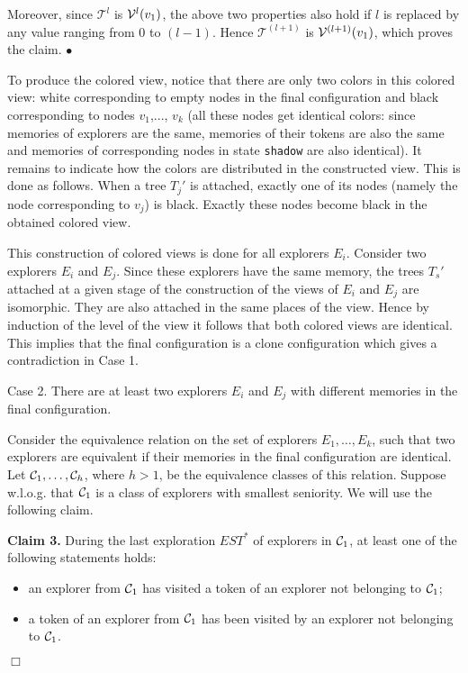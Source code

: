 \documentclass[11pt]{article}
\newcommand{\finclaim}{\hfill $\bullet$}
\newcommand{\qed}{\hfill $\Box$ \bigbreak}
\newenvironment{proof}{\noindent {\bf Proof.}}{\qed}
\newcommand{\cC}{{\cal C}}
\newcommand{\cV}{{\cal V}}
\begin{document}
\begin{proof}
{Moreover, since $\mathcal{T}^l$ is $\cV^l(v_1)$, the above two properties also hold if $l$ is replaced by any value ranging from $0$ to $(l-1)$. Hence $\mathcal{T}^{(l+1)}$ is $\cV^{(l+1)}(v_1)$, which proves the claim.} \finclaim

To produce the colored view, notice that there are only two colors in this colored view: white corresponding to empty nodes in the final configuration and
black corresponding to nodes $v_1$,..., $v_k$ (all these nodes get identical colors: since memories of explorers are the same, memories of their tokens
are also the same and memories of corresponding nodes in state {\tt shadow} are also identical).  It remains to indicate how the colors are distributed
in the constructed view. This is done as follows. When a tree $T_j'$ is attached, exactly one of its nodes (namely the node corresponding to $v_j$) is black.
Exactly these nodes become black in the obtained colored view. 

This construction of colored views is done for all explorers $E_i$. Consider two explorers $E_i$ and $E_j$.
Since these explorers have the same memory, the trees $T_s'$ attached at a given stage of the construction of the views of $E_i$ and $E_j$  are
isomorphic. They are also attached in the same places of the view. Hence by induction of the level of the view it follows that both colored views are identical.
This implies that the final configuration is a clone configuration which gives a contradiction in Case 1.

 \vspace*{0.2cm}
        \noindent
Case 2.  There are at least two explorers $E_i$ and $E_j$ with different memories in the final configuration.

Consider the equivalence relation on the set of explorers $E_1, \dots ,E_k$, such that two explorers are equivalent if their memories
in the final configuration are identical.
Let $\cC_1,\dots, \cC_h$, where $h>1$, be the equivalence classes of this relation. Suppose w.l.o.g. that $\cC_1$ is a class of explorers with smallest
seniority. We will use the following claim.

\vspace*{0.3cm}
\noindent
{{\bf Claim 3.}}
During the last exploration $EST^*$ of explorers in $\cC_1$, at least one of the following statements holds:
\begin{itemize}
\item
an explorer from $\cC_1$ has visited a token of an explorer not belonging to $\cC_1$;
\item
a token of an explorer from $\cC_1$ has been visited by an explorer not belonging to $\cC_1$.
\end{itemize}


\end{proof}
\end{document}

